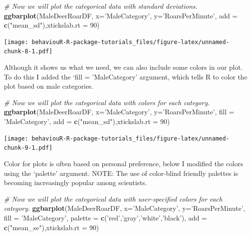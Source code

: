 \documentclass[]{book}
\newenvironment{Shaded}{\begin{snugshade}}{\end{snugshade}}
\newcommand{\CommentTok}[1]{\textcolor[rgb]{0.56,0.35,0.01}{\textit{#1}}}
\newcommand{\DataTypeTok}[1]{\textcolor[rgb]{0.13,0.29,0.53}{#1}}
\newcommand{\DecValTok}[1]{\textcolor[rgb]{0.00,0.00,0.81}{#1}}
\newcommand{\KeywordTok}[1]{\textcolor[rgb]{0.13,0.29,0.53}{\textbf{#1}}}
\newcommand{\NormalTok}[1]{#1}
\newcommand{\StringTok}[1]{\textcolor[rgb]{0.31,0.60,0.02}{#1}}
\begin{document}
\begin{Shaded}
\begin{Highlighting}[]
\CommentTok{# Now we will plot the categorical data with standard deviations. }
\KeywordTok{ggbarplot}\NormalTok{(MaleDeerRoarDF, }\DataTypeTok{x=}\StringTok{'MaleCategory'}\NormalTok{, }\DataTypeTok{y=}\StringTok{'RoarsPerMinute'}\NormalTok{, }
          \DataTypeTok{add =} \KeywordTok{c}\NormalTok{(}\StringTok{"mean_sd"}\NormalTok{),}\DataTypeTok{xtickslab.rt =} \DecValTok{90}\NormalTok{)}
\end{Highlighting}
\end{Shaded}

\texttt{[image: behaviouR-R-package-tutorials\_files/figure-latex/unnamed-chunk-8-1.pdf]}

Although it shows us what we need, we can also include some colors in our plot. To do this I added the `fill = 'MaleCategory' argument, which tells R to color the plot based on male categories.

\begin{Shaded}
\begin{Highlighting}[]
\CommentTok{# Now we will plot the categorical data with colors for each category.}
\KeywordTok{ggbarplot}\NormalTok{(MaleDeerRoarDF, }\DataTypeTok{x=}\StringTok{'MaleCategory'}\NormalTok{, }\DataTypeTok{y=}\StringTok{'RoarsPerMinute'}\NormalTok{, }\DataTypeTok{fill =} \StringTok{'MaleCategory'}\NormalTok{,}
          \DataTypeTok{add =} \KeywordTok{c}\NormalTok{(}\StringTok{"mean_sd"}\NormalTok{),}\DataTypeTok{xtickslab.rt =} \DecValTok{90}\NormalTok{)}
\end{Highlighting}
\end{Shaded}

\texttt{[image: behaviouR-R-package-tutorials\_files/figure-latex/unnamed-chunk-9-1.pdf]}

Color for plots is often based on personal preference, below I modified the colors using the `palette' argument.
NOTE: The use of color-blind friendly palettes is becoming increasingly popular among scientists.

\begin{Shaded}
\begin{Highlighting}[]
\CommentTok{# Now we will plot the categorical data with user-specified colors for each category.}
\KeywordTok{ggbarplot}\NormalTok{(MaleDeerRoarDF, }\DataTypeTok{x=}\StringTok{'MaleCategory'}\NormalTok{, }\DataTypeTok{y=}\StringTok{'RoarsPerMinute'}\NormalTok{, }\DataTypeTok{fill =} \StringTok{'MaleCategory'}\NormalTok{,}
          \DataTypeTok{palette =} \KeywordTok{c}\NormalTok{(}\StringTok{'red'}\NormalTok{,}\StringTok{'gray'}\NormalTok{,}\StringTok{'white'}\NormalTok{,}\StringTok{'black'}\NormalTok{),}
          \DataTypeTok{add =} \KeywordTok{c}\NormalTok{(}\StringTok{"mean_se"}\NormalTok{),}\DataTypeTok{xtickslab.rt =} \DecValTok{90}\NormalTok{)}
\end{Highlighting}
\end{Shaded}
\end{document}
